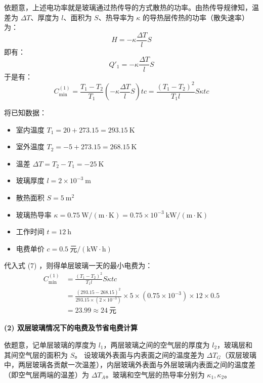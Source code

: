 \documentclass[UTF8]{ctexart}
\begin{document}
依题意，上述电功率就是玻璃通过热传导的方式散热的功率。由热传导规律知，温差为 $\Delta T$、厚度为 $l$、面积为 $S$、热导率为 $\kappa$ 的导热层传热的功率（散失速率）为：
\begin{equation*}
H = -\kappa \frac{\Delta T}{l} S
\end{equation*}
即有：
\begin{equation}
Q'_1 = -\kappa \frac{\Delta T}{l} S \tag{6}
\end{equation}
于是有：
\begin{equation}
C_{\min}^{(1)} = \frac{T_1 - T_2}{T_1} \left( -\kappa \frac{\Delta T}{l} S \right) t c = \frac{(T_1 - T_2)^2}{T_1 l} S \kappa t c \tag{7}
\end{equation}

将已知数据：
\begin{itemize}
    \item 室内温度 $T_1 = 20 + 273.15 = 293.15\ \mathrm{K}$
    \item 室外温度 $T_2 = -5 + 273.15 = 268.15\ \mathrm{K}$
    \item 温差 $\Delta T = T_2 - T_1 = -25\ \mathrm{K}$
    \item 玻璃厚度 $l = 2 \times 10^{-3}\ \mathrm{m}$
    \item 散热面积 $S = 5\ \mathrm{m}^2$
    \item 玻璃热导率 $\kappa = 0.75\ \mathrm{W/(m\cdot K)} = 0.75 \times 10^{-3}\ \mathrm{kW/(m\cdot K)}$
    \item 工作时间 $t = 12\ \mathrm{h}$
    \item 电费单价 $c = 0.5\ \text{元}/(\mathrm{kW\cdot h})$
\end{itemize}
代入式 (7) ，则得单层玻璃一天的最小电费为：
\begin{align*}
C_{\min}^{(1)} &= \frac{(T_1 - T_2)^2}{T_1 l} S \kappa t c \\
&= \frac{(293.15 - 268.15)^2}{293.15 \times (2 \times 10^{-3})} \times 5 \times (0.75 \times 10^{-3}) \times 12 \times 0.5 \\
&= 23.99 \approx 24\ \text{元}
\end{align*}

\vspace{1em}
\textbf{(2) 双层玻璃情况下的电费及节省电费计算}

依题意，记单层玻璃的厚度为 $l_1$，两层玻璃之间的空气层的厚度为 $l_2$，玻璃层和其间空气层的面积为 $S$。
设玻璃外表面与内表面之间的温度差为 $\Delta T_G$（双层玻璃中，两层玻璃各贡献一次温差），内层玻璃外表面与外层玻璃内表面之间的温度差（即空气层两端的温差）为 $\Delta T_A$。玻璃和空气层的热导率分别为 $\kappa_1, \kappa_2$。
\end{document}

